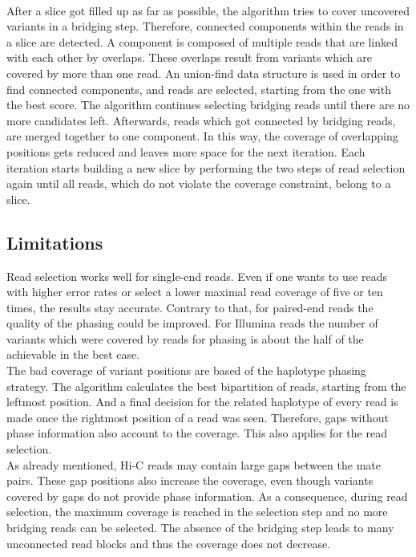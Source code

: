 \\
After a slice got filled up as far as possible, the algorithm tries to cover uncovered variants in a bridging step. Therefore, connected components within the reads in a slice are detected. A component is composed of multiple reads that are linked with each other by overlaps. These overlaps result from variants which are covered by more than one read. An union-find data structure is used in order to find connected components, and reads are selected, starting from the one with the best score. The algorithm continues selecting bridging reads until there are no more candidates left. Afterwards, reads which got connected by bridging reads, are merged together to one component. In this way, the coverage of overlapping positions gets reduced and leaves more space for the next iteration. Each iteration starts building a new slice by performing the two steps of read selection again until all reads, which do not violate the coverage constraint, belong to a slice. \cite{Readselection}

\subsection{Limitations}
\label{Limitations}
Read selection works well for single-end reads. Even if one wants to use reads with higher error rates or select a lower maximal read coverage of five or ten times, the results stay accurate. \cite{Appnote} Contrary to that, for paired-end reads the quality of the phasing could be improved. For Illumina reads the number of variants which were covered by reads for phasing is about the half of the achievable in the best case.\\
The bad coverage of variant positions are based of the haplotype phasing strategy. The algorithm calculates the best bipartition of reads, starting from the leftmost position. And a final decision for the related haplotype of every read is made once the rightmost position of a read was seen. Therefore, gaps without phase information also account to the coverage. This also applies for the read selection. \cite{WhatsHap}\\
As already mentioned, Hi-C reads may contain large gaps between the mate pairs. These gap positions also increase the coverage, even though variants covered by gaps do not provide phase information. As a consequence, during read selection, the maximum coverage is reached in the selection step and no more bridging reads can be selected. The absence of the bridging step leads to many unconnected read blocks and thus the coverage does not decrease.

